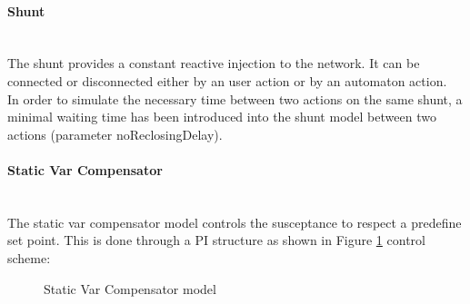 \documentclass[a4paper, 12pt]{report}
\begin{document}
\paragraph{Shunt}
~~\\

The shunt provides a constant reactive injection to the network. It can be connected or disconnected either by an user action or by an automaton action. \\
In order to simulate the necessary time between two actions on the same shunt, a minimal waiting time has been introduced into the shunt model between two actions (parameter noReclosingDelay). \\

\paragraph{Static Var Compensator}
~~\\

The static var compensator model controls the susceptance to respect a predefine set point. This is done through a PI structure as shown in Figure \ref{StaticVarCompensator} control scheme:

\begin{figure}[h]
  \setlength{\abovecaptionskip}{15pt}
\centering
 \caption{Static Var Compensator model}
 \label{StaticVarCompensator}
\end{figure}
\end{document}
